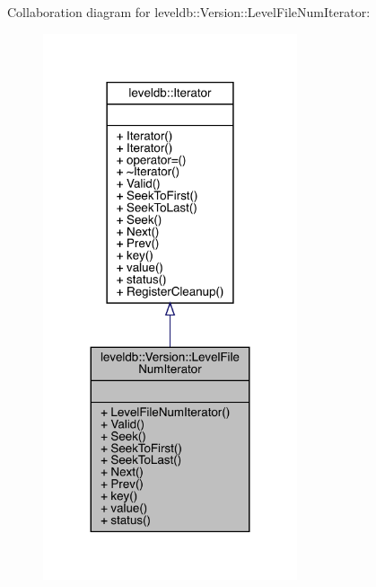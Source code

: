 Collaboration diagram for leveldb\+::Version\+::Level\+File\+Num\+Iterator\+:
\nopagebreak
\begin{figure}[H]
\begin{center}
\leavevmode
\includegraphics[width=212pt]{classleveldb_1_1_version_1_1_level_file_num_iterator__coll__graph}
\end{center}
\end{figure}
